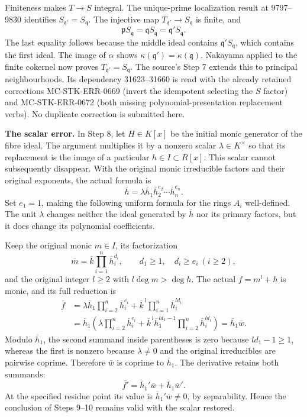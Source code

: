 Finiteness makes \(T\to S\) integral. The unique-prime localization result at 9797--9830 identifies \(S_{\mathfrak q'}=S_{\mathfrak q}\). The injective map \(T_{\mathfrak q'}\to S_{\mathfrak q}\) is finite, and \[
\mathfrak pS_{\mathfrak q}
=\mathfrak qS_{\mathfrak q}
=\mathfrak q'S_{\mathfrak q}.
\] The last equality follows because the middle ideal contains \(\mathfrak q'S_{\mathfrak q}\), which contains the first ideal. The image of \(\alpha\) shows \(\kappa(\mathfrak q')=\kappa(\mathfrak q)\). Nakayama applied to the finite cokernel now proves \(T_{\mathfrak q'}=S_{\mathfrak q}\). The source's Step 7 extends this to principal neighbourhoods. Its dependency 31623--31660 is read with the already retained corrections MC-\AlgebraIdentifierBreak{}STK-\AlgebraIdentifierBreak{}ERR-\AlgebraIdentifierBreak{}0669 (invert the idempotent selecting the \(S\) factor) and MC-\AlgebraIdentifierBreak{}STK-\AlgebraIdentifierBreak{}ERR-\AlgebraIdentifierBreak{}0672 (both missing polynomial-presentation replacement verbs). No duplicate correction is submitted here.

\textbf{The scalar error.} In Step 8, let \(H\in K[x]\) be the initial monic generator of the fibre ideal. The argument multiplies it by a nonzero scalar \(\lambda\in K^\times\) so that its replacement is the image of a particular \(h\in I\subset R[x]\). This scalar cannot subsequently disappear. With the original monic irreducible factors and their original exponents, the actual formula is \[
\overline h
=\lambda\overline h_1\overline h_2^{e_2}\cdots\overline h_n^{e_n}.
\] Set \(e_1=1\), making the following uniform formula for the rings \(A_i\) well-defined. The unit \(\lambda\) changes neither the ideal generated by \(\overline h\) nor its primary factors, but it does change its polynomial coefficients.

Keep the original monic \(m\in I\), its factorization \[
\overline m=\overline k\prod_{i=1}^n\overline h_i^{d_i},
\qquad d_1\ge1,\quad d_i\ge e_i\ (i\ge2),
\] and the original integer \(l\ge2\) with \(l\deg m>\deg h\). The actual \(f=m^l+h\) is monic, and its full reduction is \[
\begin{aligned}
\overline f
&=\lambda\overline h_1\prod_{i=2}^n\overline h_i^{e_i}
 +\overline k^{\,l}\prod_{i=1}^n\overline h_i^{ld_i}\\
&=\overline h_1
\left(
\lambda\prod_{i=2}^n\overline h_i^{e_i}
+\overline k^{\,l}\overline h_1^{ld_1-1}
 \prod_{i=2}^n\overline h_i^{ld_i}
\right)
=\overline h_1\overline w.
\end{aligned}
\] Modulo \(\overline h_1\), the second summand inside parentheses is zero because \(ld_1-1\ge1\), whereas the first is nonzero because \(\lambda\ne0\) and the original irreducibles are pairwise coprime. Therefore \(\overline w\) is coprime to \(\overline h_1\). The derivative retains both summands: \[
\overline{f'}=\overline h_1'\overline w+\overline h_1\overline w'.
\] At the specified residue point its value is \(\overline h_1'\overline w\ne0\), by separability. Hence the conclusion of Steps 9--10 remains valid with the scalar restored.

